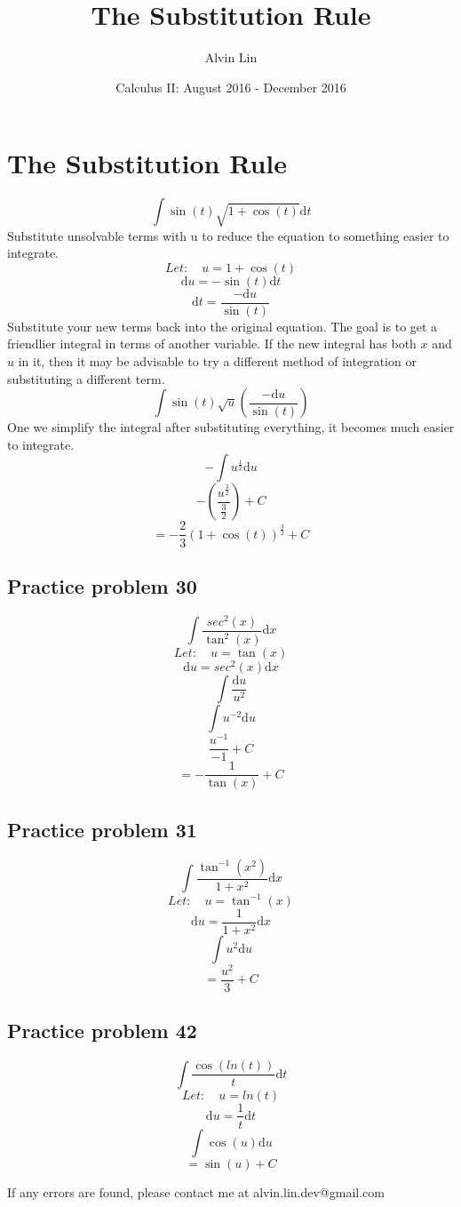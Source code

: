 \documentclass[letterpaper, 12pt]{article}
\title{The Substitution Rule}
\author{Alvin Lin}
\date{Calculus II: August 2016 - December 2016}
\renewcommand*{\arctan}{\tan^{-1}}
\newcommand*{\diff}{\mathrm{d}}
\begin{document}
\maketitle

\section*{The Substitution Rule}
\[ \int{\sin(t)\sqrt{1+\cos(t)}\diff{t}} \]
Substitute unsolvable terms with u to reduce the equation to something easier
to integrate.
\[ Let: \quad u = 1+\cos(t) \]
\[ \diff{u} = -\sin(t)\diff{t} \]
\[ \diff{t} = \frac{-\diff{u}}{\sin(t)} \]
Substitute your new terms back into the original equation. The goal is to get
a friendlier integral in terms of another variable. If the new integral has
both \( x \) and \( u \) in it, then it may be advisable to try a different method
of integration or substituting a different term.
\[ \int{\sin(t)\sqrt{u}(\frac{-\diff{u}}{\sin(t)})} \]
One we simplify the integral after substituting everything, it becomes much
easier to integrate.
\[ -\int{u^{\frac{1}{2}}\diff{u}} \]
\[ -(\frac{u^{\frac{3}{2}}}{\frac{3}{2}})+C \]
\[ = -\frac{2}{3}(1+\cos(t))^{\frac{3}{2}}+C \]

\subsection*{Practice problem 30}
\[ \int{\frac{sec^{2}(x)}{\tan^{2}(x)}\diff{x}} \]
\[ Let: \quad u = \tan(x) \]
\[ \diff{u} = sec^{2}(x)\diff{x} \]
\[ \int{\frac{\diff{u}}{u^{2}}} \]
\[ \int{u^{-2}\diff{u}} \]
\[ \frac{u^{-1}}{-1}+C \]
\[ = -\frac{1}{\tan(x)}+C \]

\subsection*{Practice problem 31}
\[ \int{\frac{\arctan(x^{2})}{1+x^{2}}\diff{x}} \]
\[ Let: \quad u = \arctan(x) \]
\[ \diff{u} = \frac{1}{1+x^{2}}\diff{x} \]
\[ \int{u^{2}\diff{u}} \]
\[ = \frac{u^{2}}{3}+C \]

\subsection*{Practice problem 42}
\[ \int{\frac{\cos(ln(t))}{t}\diff{t}} \]
\[ Let: \quad u = ln(t) \]
\[ \diff{u} = \frac{1}{t}\diff{t} \]
\[ \int{\cos(u)\diff{u}} \]
\[ = \sin(u)+C \]

\begin{center}
  If any errors are found, please contact me at alvin.lin.dev@gmail.com
\end{center}
\end{document}
